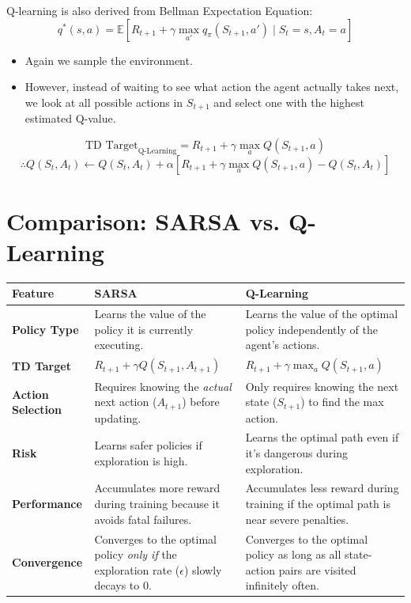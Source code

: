 \documentclass[12pt]{article}
\begin{document}
\noindent Q-learning is also derived from Bellman Expectation Equation:
$$ q^*(s,a) = \mathbb{E} \left[ R_{t+1} + \gamma \max_{a'} q_\pi(S_{t+1}, a') \mid S_t=s, A_t=a \right] $$

\begin{itemize}[label=$\bullet$]
    \item Again we sample the environment.
    \item However, instead of waiting to see what action the agent actually takes next, we look at all possible actions in $S_{t+1}$ and select one with the highest estimated Q-value.
\end{itemize}

$$ \text{TD Target}_{\text{Q-Learning}} = R_{t+1} + \gamma \max_a Q(S_{t+1}, a) $$
$$ \therefore Q(S_t, A_t) \leftarrow Q(S_t, A_t) + \alpha \left[ R_{t+1} + \gamma \max_a Q(S_{t+1}, a) - Q(S_t, A_t) \right] $$



\section*{Comparison: SARSA vs. Q-Learning}

\begin{table}[h!]
\centering
\renewcommand{\arraystretch}{1.8}
\begin{tabular}{| p{} | p{} | p{} |}
\hline
\textbf{Feature} & \textbf{SARSA} & \textbf{Q-Learning} \\ \hline
\textbf{Policy Type} &  Learns the value of the policy it is currently executing. & Learns the value of the optimal policy independently of the agent's actions. \\ \hline
\textbf{TD Target} & $R_{t+1} + \gamma Q(S_{t+1}, A_{t+1})$ & $R_{t+1} + \gamma \max_a Q(S_{t+1}, a)$ \\ \hline
\textbf{Action Selection} & Requires knowing the \textit{actual} next action ($A_{t+1}$) before updating. & Only requires knowing the next state ($S_{t+1}$) to find the max action. \\ \hline
\textbf{Risk} & Learns safer policies if exploration is high. &Learns the optimal path even if it's dangerous during exploration. \\ \hline
\textbf{Performance} & Accumulates more reward during training because it avoids fatal failures. & Accumulates less reward during training if the optimal path is near severe penalties. \\ \hline
\textbf{Convergence} & Converges to the optimal policy \textit{only if} the exploration rate ($\epsilon$) slowly decays to 0. & Converges to the optimal policy as long as all state-action pairs are visited infinitely often. \\ \hline
\end{tabular}
\end{table}
\end{document}
